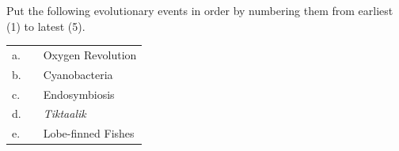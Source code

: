 \question[5]
Put the following evolutionary events in order by numbering them from earliest (1) to latest (5).
\vspace*{\baselineskip}

\begin{tabular}{@{}L{0.35cm}R{1.1cm}l@{}}
a.  &     &   Oxygen Revolution \\[1em]

b.  &     &   Cyanobacteria \\[1em]

c.  &     &   Endosymbiosis \\[1em]

d.  &     &   \textit{Tiktaalik} \\[1em]


e.  &     &   Lobe-finned Fishes \\
\end{tabular}

